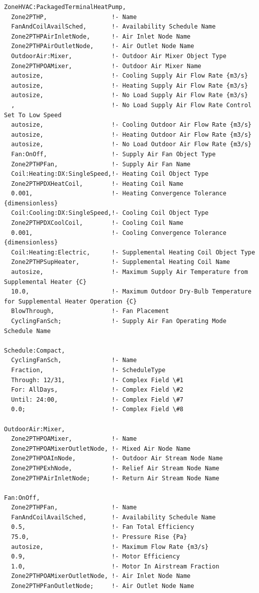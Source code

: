 \begin{lstlisting}
ZoneHVAC:PackagedTerminalHeatPump,
  Zone2PTHP,                  !- Name
  FanAndCoilAvailSched,       !- Availability Schedule Name
  Zone2PTHPAirInletNode,      !- Air Inlet Node Name
  Zone2PTHPAirOutletNode,     !- Air Outlet Node Name
  OutdoorAir:Mixer,           !- Outdoor Air Mixer Object Type
  Zone2PTHPOAMixer,           !- Outdoor Air Mixer Name
  autosize,                   !- Cooling Supply Air Flow Rate {m3/s}
  autosize,                   !- Heating Supply Air Flow Rate {m3/s}
  autosize,                   !- No Load Supply Air Flow Rate {m3/s}
  ,                           !- No Load Supply Air Flow Rate Control Set To Low Speed
  autosize,                   !- Cooling Outdoor Air Flow Rate {m3/s}
  autosize,                   !- Heating Outdoor Air Flow Rate {m3/s}
  autosize,                   !- No Load Outdoor Air Flow Rate {m3/s}
  Fan:OnOff,                  !- Supply Air Fan Object Type
  Zone2PTHPFan,               !- Supply Air Fan Name
  Coil:Heating:DX:SingleSpeed,!- Heating Coil Object Type
  Zone2PTHPDXHeatCoil,        !- Heating Coil Name
  0.001,                      !- Heating Convergence Tolerance {dimensionless}
  Coil:Cooling:DX:SingleSpeed,!- Cooling Coil Object Type
  Zone2PTHPDXCoolCoil,        !- Cooling Coil Name
  0.001,                      !- Cooling Convergence Tolerance {dimensionless}
  Coil:Heating:Electric,      !- Supplemental Heating Coil Object Type
  Zone2PTHPSupHeater,         !- Supplemental Heating Coil Name
  autosize,                   !- Maximum Supply Air Temperature from Supplemental Heater {C}
  10.0,                       !- Maximum Outdoor Dry-Bulb Temperature for Supplemental Heater Operation {C}
  BlowThrough,                !- Fan Placement
  CyclingFanSch;              !- Supply Air Fan Operating Mode Schedule Name

Schedule:Compact,
  CyclingFanSch,              !- Name
  Fraction,                   !- ScheduleType
  Through: 12/31,             !- Complex Field \#1
  For: AllDays,               !- Complex Field \#2
  Until: 24:00,               !- Complex Field \#7
  0.0;                        !- Complex Field \#8

OutdoorAir:Mixer,
  Zone2PTHPOAMixer,           !- Name
  Zone2PTHPOAMixerOutletNode, !- Mixed Air Node Name
  Zone2PTHPOAInNode,          !- Outdoor Air Stream Node Name
  Zone2PTHPExhNode,           !- Relief Air Stream Node Name
  Zone2PTHPAirInletNode;      !- Return Air Stream Node Name

Fan:OnOff,
  Zone2PTHPFan,               !- Name
  FanAndCoilAvailSched,       !- Availability Schedule Name
  0.5,                        !- Fan Total Efficiency
  75.0,                       !- Pressure Rise {Pa}
  autosize,                   !- Maximum Flow Rate {m3/s}
  0.9,                        !- Motor Efficiency
  1.0,                        !- Motor In Airstream Fraction
  Zone2PTHPOAMixerOutletNode, !- Air Inlet Node Name
  Zone2PTHPFanOutletNode;     !- Air Outlet Node Name


\end{lstlisting}
